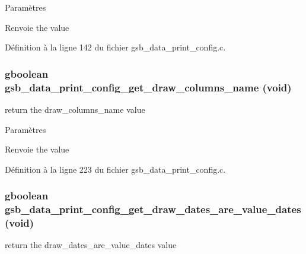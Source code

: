 \begin{DoxyParams}{Paramètres}
\item[{\em }]\end{DoxyParams}
\begin{DoxyReturn}{Renvoie}
the value 
\end{DoxyReturn}


Définition à la ligne 142 du fichier gsb\_\-data\_\-print\_\-config.c.

\subsubsection[{gsb\_\-data\_\-print\_\-config\_\-get\_\-draw\_\-columns\_\-name}]{\setlength{\rightskip}{0pt plus 5cm}gboolean gsb\_\-data\_\-print\_\-config\_\-get\_\-draw\_\-columns\_\-name (void)}\label{gsb__data__print__config_8h_a01e892528ff87835487d03a5ba6c24e5}
return the draw\_\-columns\_\-name value


\begin{DoxyParams}{Paramètres}
\item[{\em }]\end{DoxyParams}
\begin{DoxyReturn}{Renvoie}
the value 
\end{DoxyReturn}


Définition à la ligne 223 du fichier gsb\_\-data\_\-print\_\-config.c.

\subsubsection[{gsb\_\-data\_\-print\_\-config\_\-get\_\-draw\_\-dates\_\-are\_\-value\_\-dates}]{\setlength{\rightskip}{0pt plus 5cm}gboolean gsb\_\-data\_\-print\_\-config\_\-get\_\-draw\_\-dates\_\-are\_\-value\_\-dates (void)}\label{gsb__data__print__config_8h_a533bc3e1fa5039645557a0d959571497}
return the draw\_\-dates\_\-are\_\-value\_\-dates value



